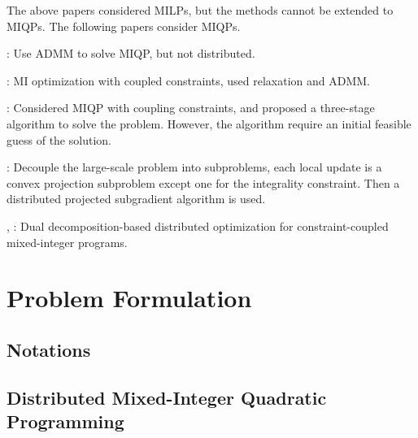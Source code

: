 \documentclass[twocolumn,amsthm]{autart}%
\theoremstyle{definition}
\theoremstyle{plain}
\begin{document}
The above papers considered MILPs, but the methods cannot be extended to MIQPs. The following papers consider MIQPs.

\cite{takapoui2020simple}: Use ADMM to solve MIQP, but not distributed.

\cite{liu2022distributed}: MI optimization with coupled constraints, used relaxation and ADMM.

\cite{liu2021distributed}: Considered MIQP with coupling constraints, and proposed a three-stage algorithm to solve the problem. However, the algorithm require an initial feasible guess of the solution.

\cite{sun2018distributed}: Decouple the large-scale problem into subproblems, each local update is a convex projection subproblem except one for the integrality constraint. Then a distributed projected subgradient algorithm is used.

\cite{yfantis2023hierarchical}, \cite{klostermeier2024numerical}: Dual decomposition-based distributed optimization for constraint-coupled mixed-integer programs.


\section{Problem Formulation}

\subsection{Notations}


\subsection{Distributed Mixed-Integer Quadratic Programming}
\end{document}
